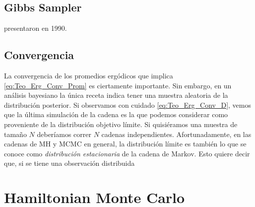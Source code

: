 \subsection{Gibbs Sampler}

\textcite{GelfandSmith90} presentaron en 1990. 

\subsection{Convergencia}

La convergencia de los promedios ergódicos que implica \eqref{eq:Teo_Erg_Conv_Prom} es ciertamente importante. Sin embargo, en un análisis bayesiano la única receta indica tener una muestra aleatoria de la distribución posterior. Si observamos con cuidado \eqref{eq:Teo_Erg_Conv_D}, vemos que la última simulación de la cadena es la que podemos considerar como proveniente de la distribución objetivo límite. Si quisiéramos una muestra de tamaño $N$ deberíamos correr $N$ cadenas independientes. Afortunadamente, en las cadenas de MH y MCMC en general, la distribución límite es también lo que se conoce como \textit{distribución estacionaria} de la cadena de Markov. Esto quiere decir que, si se tiene una observación distribuida\\

\section{Hamiltonian Monte Carlo}